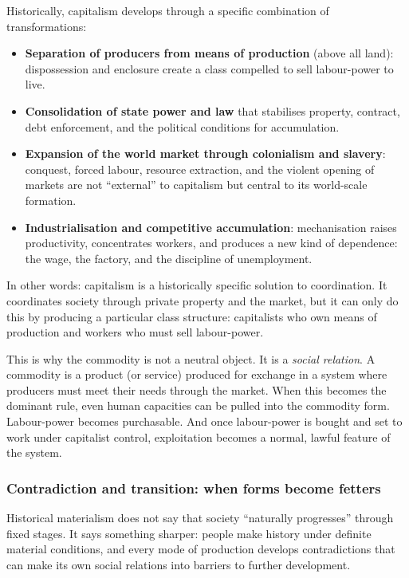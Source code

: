 Historically, capitalism develops through a specific combination of transformations:

\begin{itemize}[leftmargin=1.5em]
  \item \textbf{Separation of producers from means of production} (above all land): dispossession and enclosure create a class compelled
        to sell labour-power to live.\cite{Marx1867,Heller2011}
  \item \textbf{Consolidation of state power and law} that stabilises property, contract, debt enforcement, and the political conditions
        for accumulation.\cite{Marx1859}
  \item \textbf{Expansion of the world market through colonialism and slavery}: conquest, forced labour, resource extraction, and the violent
        opening of markets are not ``external'' to capitalism but central to its world-scale formation.\cite{Marx1867,Beckert2014}
  \item \textbf{Industrialisation and competitive accumulation}: mechanisation raises productivity, concentrates workers, and produces a new
        kind of dependence: the wage, the factory, and the discipline of unemployment.\cite{CambridgeCapitalism1,CambridgeCapitalism2}
\end{itemize}

In other words: capitalism is a historically specific solution to coordination. It coordinates society through private property and the
market, but it can only do this by producing a particular class structure: capitalists who own means of production and workers who must sell
labour-power.

This is why the commodity is not a neutral object. It is a \emph{social relation}. A commodity is a product (or service) produced for exchange
in a system where producers must meet their needs through the market. When this becomes the dominant rule, even human capacities can be pulled
into the commodity form. Labour-power becomes purchasable. And once labour-power is bought and set to work under capitalist control, exploitation
becomes a normal, lawful feature of the system.

\subsubsection{Contradiction and transition: when forms become fetters}
\label{sec:forms-fetters}

Historical materialism does not say that society ``naturally progresses'' through fixed stages. It says something sharper:
people make history under definite material conditions, and every mode of production develops contradictions that can make its own
social relations into barriers to further development.

